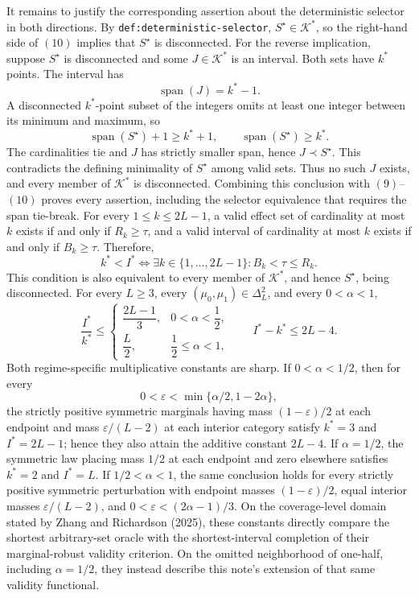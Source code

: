 It remains to justify the corresponding assertion about the deterministic selector in both directions.  By \texttt{def:deterministic-selector}, \(S^\star\in\mathcal K^*\), so the right-hand side of \((10)\) implies that \(S^\star\) is disconnected.  For the reverse implication, suppose \(S^\star\) is disconnected and some \(J\in\mathcal K^*\) is an interval.  Both sets have \(k^*\) points.  The interval has
\[
\operatorname{span}(J)=k^*-1.
\]
A disconnected \(k^*\)-point subset of the integers omits at least one integer between its minimum and maximum, so
\[
\operatorname{span}(S^\star)+1\geq k^*+1,
\qquad
\operatorname{span}(S^\star)\geq k^*.
\]
The cardinalities tie and \(J\) has strictly smaller span, hence \(J\prec S^\star\).  This contradicts the defining minimality of \(S^\star\) among valid sets.  Thus no such \(J\) exists, and every member of \(\mathcal K^*\) is disconnected.  Combining this conclusion with \((9)\)--\((10)\) proves every assertion, including the selector equivalence that requires the span tie-break.
For every \(1\leq k\leq2L-1\), a valid effect set of cardinality at most \(k\) exists if and only if \(R_k\geq\tau\), and a valid interval of cardinality at most \(k\) exists if and only if \(B_k\geq\tau\). Therefore,
\[
k^*<I^*\iff\exists k\in\{1,\ldots,2L-1\}:B_k<\tau\leq R_k.
\]
This condition is also equivalent to every member of \(\mathcal K^*\), and hence \(S^\star\), being disconnected.
For every \(L\geq3\), every \((\mu_0,\mu_1)\in\Delta_L^2\), and every \(0<\alpha<1\),
\[
\frac{I^*}{k^*}\leq
\begin{cases}
\dfrac{2L-1}{3},&0<\alpha<\dfrac12,\\[3pt]
\dfrac L2,&\dfrac12\leq\alpha<1,
\end{cases}
\qquad
I^*-k^*\leq2L-4.
\]
Both regime-specific multiplicative constants are sharp.  If \(0<\alpha<1/2\), then for every
\[
0<\varepsilon<\min\{\alpha/2,1-2\alpha\},
\]
the strictly positive symmetric marginals having mass \((1-\varepsilon)/2\) at each endpoint and mass \(\varepsilon/(L-2)\) at each interior category satisfy \(k^*=3\) and \(I^*=2L-1\); hence they also attain the additive constant \(2L-4\).  If \(\alpha=1/2\), the symmetric law placing mass \(1/2\) at each endpoint and zero elsewhere satisfies \(k^*=2\) and \(I^*=L\).  If \(1/2<\alpha<1\), the same conclusion holds for every strictly positive symmetric perturbation with endpoint masses \((1-\varepsilon)/2\), equal interior masses \(\varepsilon/(L-2)\), and \(0<\varepsilon<(2\alpha-1)/3\).  On the coverage-level domain stated by Zhang and Richardson (2025), these constants directly compare the shortest arbitrary-set oracle with the shortest-interval completion of their marginal-robust validity criterion.  On the omitted neighborhood of one-half, including \(\alpha=1/2\), they instead describe this note's extension of that same validity functional.
